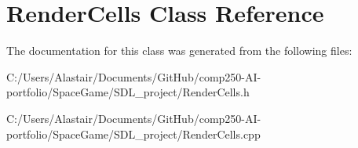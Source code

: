 \hypertarget{class_render_cells}{}\section{Render\+Cells Class Reference}
\label{class_render_cells}


The documentation for this class was generated from the following files\+:\begin{DoxyCompactItemize}
\item 
C\+:/\+Users/\+Alastair/\+Documents/\+Git\+Hub/comp250-\/\+A\+I-\/portfolio/\+Space\+Game/\+S\+D\+L\+\_\+project/Render\+Cells.\+h\item 
C\+:/\+Users/\+Alastair/\+Documents/\+Git\+Hub/comp250-\/\+A\+I-\/portfolio/\+Space\+Game/\+S\+D\+L\+\_\+project/Render\+Cells.\+cpp\end{DoxyCompactItemize}
